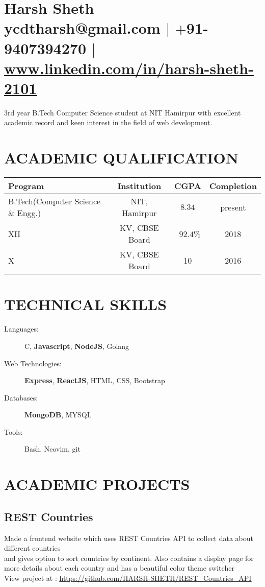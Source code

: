 \documentclass[12pt]{article}
\begin{document}
\section{Harsh Sheth\\ ycdtharsh@gmail.com $|$ $+$91-9407394270 $|$ \url{www.linkedin.com/in/harsh-sheth-2101}}
\par{3rd year B.Tech Computer Science student at NIT Hamirpur with excellent academic record and keen interest in the field of web development.}

\section{ACADEMIC QUALIFICATION}
\begin{tabular}{|l|c|c|c|}
  \hline
  Program & Institution & CGPA & Completion \\
  \hline
  B.Tech(Computer Science \& Engg.) & NIT, Hamirpur & $8.34$ & present\\
  XII & KV, CBSE Board & \ $92.4\%$ & 2018\\
  X & KV, CBSE Board & 10 & 2016\\
  \hline
\end{tabular}

\section{TECHNICAL SKILLS}
\begin{description}
  \item[Languages:]{C, \textbf{Javascript}, \textbf{NodeJS}, Golang}
  \item[Web Technologies:]{\textbf{Express}, \textbf{ReactJS}, HTML, CSS, Bootstrap}
  \item[Databases:]{\textbf{MongoDB}, MYSQL}
  \item[Tools:]{Bash, Neovim, git}
\end{description}


\section{ACADEMIC PROJECTS}
\subsection*{REST Countries}
  \parbox{\textwidth}{ Made a frontend website which uses REST Countries API to collect data about different countries\\
   and gives option to sort countries by continent. Also contains a display page for more details about each country and has a beautiful color theme switcher\\
   View project at : \underline{\url{https://github.com/HARSH-SHETH/REST_Countries_API}}
  }
\end{document}
